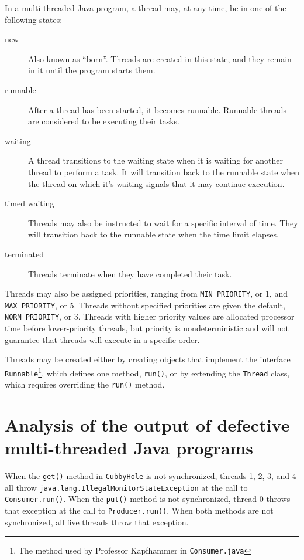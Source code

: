 \documentclass[12pt,a4paper]{article}
\begin{document}
  	In a multi-threaded Java program, a thread may, at any time, be in one of the following states:
  	\begin{description}
  		\item[new]{Also known as ``born''. Threads are created in this state, and they remain in it until the program starts them.}
  		\item[runnable]{After a thread has been started, it becomes runnable. Runnable threads are considered to be executing their tasks.}
  		\item[waiting]{A thread transitions to the waiting state when it is waiting for another thread to perform a task. It will transition back to the runnable state when the thread on which it's waiting signals that it may continue execution.}
  		\item[timed waiting]{Threads may also be instructed to wait for a specific interval of time. They will transition back to the runnable state when the time limit elapses.}
  		\item[terminated]{Threads terminate when they have completed their task.}
  	\end{description}

  	Threads may also be assigned priorities, ranging from \texttt{MIN\_PRIORITY}, or 1, and \allowbreak\texttt{MAX\_PRIORITY}, or 5. Threads without specified priorities are given the default, \allowbrek\texttt{NORM\_PRIORITY}, or 3. Threads with higher priority values are allocated processor time before lower-priority threads, but priority is nondeterministic and will not guarantee that threads will execute in a specific order. 

  	Threads may be created either by creating objects that implement the interface \texttt{Runnable}\footnote{The method used by Professor Kapfhammer in \texttt{Consumer.java}}, which defines one method, \texttt{run()}, or by extending the \texttt{Thread} class, which requires overriding the \texttt{run()} method. 

  \section{Analysis of the output of defective multi-threaded Java programs}

  	When the \texttt{get()} method in \texttt{CubbyHole} is not synchronized, threads 1, 2, 3, and 4 all throw \allowbreak\texttt{java.lang.IllegalMonitorStateException} at the call to \texttt{Consumer.run()}. When the \texttt{put()} method is not synchronized, thread 0 throws that exception at the call to \texttt{Producer.run()}. When both methods are not synchronized, all five threads throw that exception.
\end{document}
